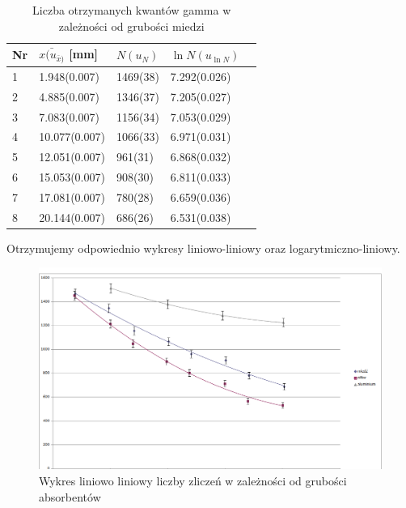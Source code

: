 \documentclass[a4paper]{article}
\begin{document}
\begin{table}[h!]
\centering
\begin{tabular}{ | l | l | l | l | l | }
\hline
Nr & $\bar{x(u_{\bar{x})}}$ [mm] & $N(u_N)$ & $\ln{N}(u_{\ln{N}})$ \\ \hline
1 & 1.948(0.007) & 1469(38) & 7.292(0.026)  \\ \hline
2 & 4.885(0.007) & 1346(37) & 7.205(0.027)  \\ \hline
3 & 7.083(0.007) & 1156(34) & 7.053(0.029) \\ \hline
4 & 10.077(0.007) & 1066(33) & 6.971(0.031) \\ \hline
5 & 12.051(0.007) & 961(31) & 6.868(0.032) \\ \hline
6 & 15.053(0.007) & 908(30) & 6.811(0.033) \\ \hline
7 & 17.081(0.007) & 780(28) & 6.659(0.036) \\ \hline
8 & 20.144(0.007) & 686(26) & 6.531(0.038) \\ \hline   
\end{tabular}
\caption{Liczba otrzymanych kwantów gamma w zależności od grubości miedzi}
\label{pomiary_sruba}
\end{table}

Otrzymujemy odpowiednio wykresy liniowo-liniowy oraz logarytmiczno-liniowy.
\begin{figure}[h!]
\centering
\includegraphics[scale=0.55]{liniowo_liniowy.png}
\caption{Wykres liniowo liniowy liczby zliczeń w zależności od grubości absorbentów}
\label{uklad_pomiarowy}
\end{figure}
\end{document}
